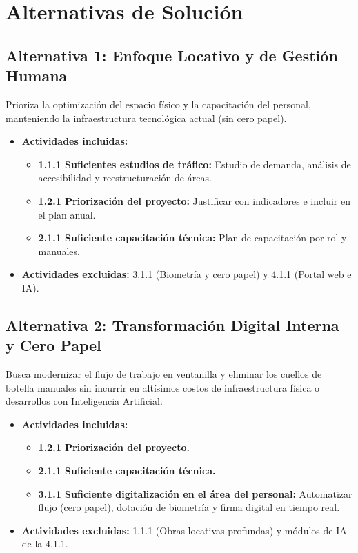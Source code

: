 \section{Alternativas de Solución}

\subsection*{Alternativa 1: Enfoque Locativo y de Gestión Humana}
Prioriza la optimización del espacio físico y la capacitación del personal, manteniendo la infraestructura tecnológica actual (sin cero papel).
\begin{itemize}
    \item \textbf{Actividades incluidas:}
    \begin{itemize}
        \item \textbf{1.1.1 Suficientes estudios de tráfico:} Estudio de demanda, análisis de accesibilidad y reestructuración de áreas.
        \item \textbf{1.2.1 Priorización del proyecto:} Justificar con indicadores e incluir en el plan anual.
        \item \textbf{2.1.1 Suficiente capacitación técnica:} Plan de capacitación por rol y manuales.
    \end{itemize}
    \item \textbf{Actividades excluidas:} 3.1.1 (Biometría y cero papel) y 4.1.1 (Portal web e IA).
\end{itemize}

\subsection*{Alternativa 2: Transformación Digital Interna y Cero Papel}
Busca modernizar el flujo de trabajo en ventanilla y eliminar los cuellos de botella manuales sin incurrir en altísimos costos de infraestructura física o desarrollos con Inteligencia Artificial.
\begin{itemize}
    \item \textbf{Actividades incluidas:}
    \begin{itemize}
        \item \textbf{1.2.1 Priorización del proyecto.}
        \item \textbf{2.1.1 Suficiente capacitación técnica.}
        \item \textbf{3.1.1 Suficiente digitalización en el área del personal:} Automatizar flujo (cero papel), dotación de biometría y firma digital en tiempo real.
    \end{itemize}
    \item \textbf{Actividades excluidas:} 1.1.1 (Obras locativas profundas) y módulos de IA de la 4.1.1.
\end{itemize}

